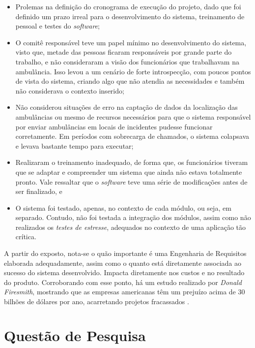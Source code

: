 \begin{itemize}
    \item Prolemas na definição do cronograma de execução do projeto, dado que foi definido um prazo irreal para o desenvolvimento do sistema, treinamento de pessoal e testes do \textit{software};
    
    \item O comitê responsável teve um papel mínimo no desenvolvimento do sistema, visto que, metade das pessoas ficaram responsáveis por grande parte do trabalho, e não consideraram a visão dos funcionários que trabalhavam na ambulância. Isso levou a um cenário de forte introspecção, com poucos pontos de vista do sistema, criando algo que não atendia as necessidades e também não considerava o contexto inserido;
    
    \item Não considerou situações de erro na captação de dados da localização das ambulâncias ou mesmo de recursos necessários para que o sistema responsável por enviar ambulâncias em locais de incidentes pudesse funcionar corretamente. Em períodos com sobrecarga de chamados, o sistema colapsava e levava bastante tempo para executar;
    
    \item Realizaram o treinamento inadequado, de forma que, os funcionários tiveram que se adaptar e compreender um sistema que ainda não estava totalmente pronto. Vale ressaltar que o \textit{software} teve uma série de modificações antes de ser finalizado, e
    
    \item O sistema foi testado, apenas, no contexto de cada módulo, ou seja, em separado. Contudo, não foi testada a integração dos módulos, assim como não realizados os \textit{testes de estresse}, adequados no contexto de uma aplicação tão crítica.
\end{itemize}

A partir do exposto, nota-se o quão importante é uma Engenharia de Requisitos elaborada adequadamente, assim como o quanto está diretamente associada ao sucesso do sistema desenvolvido. Impacta diretamente nos custos e no resultado do produto. Corroborando com esse ponto, há um estudo realizado por \textit{Donald Firesmith}, mostrando que as empresas americanas têm um prejuízo acima de 30 bilhões de dólares por ano, acarretando projetos fracassados \cite{king2008cost}.

\section{Questão de Pesquisa}

